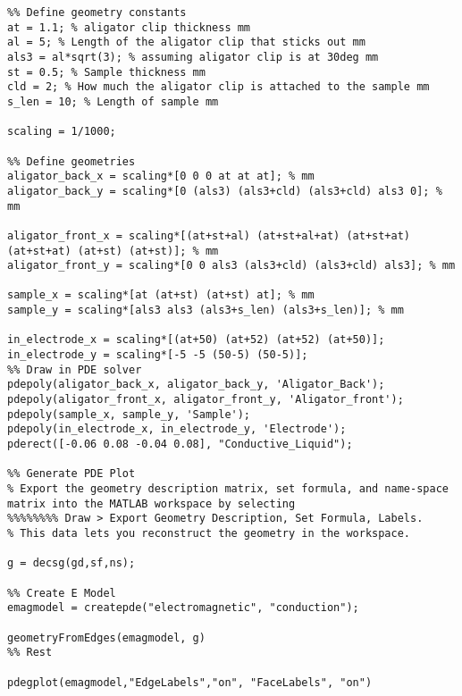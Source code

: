 
\begin{lstlisting}
%% Define geometry constants
at = 1.1; % aligator clip thickness mm
al = 5; % Length of the aligator clip that sticks out mm
als3 = al*sqrt(3); % assuming aligator clip is at 30deg mm
st = 0.5; % Sample thickness mm
cld = 2; % How much the aligator clip is attached to the sample mm
s_len = 10; % Length of sample mm

scaling = 1/1000;

%% Define geometries
aligator_back_x = scaling*[0 0 0 at at at]; % mm
aligator_back_y = scaling*[0 (als3) (als3+cld) (als3+cld) als3 0]; % mm

aligator_front_x = scaling*[(at+st+al) (at+st+al+at) (at+st+at) (at+st+at) (at+st) (at+st)]; % mm
aligator_front_y = scaling*[0 0 als3 (als3+cld) (als3+cld) als3]; % mm

sample_x = scaling*[at (at+st) (at+st) at]; % mm
sample_y = scaling*[als3 als3 (als3+s_len) (als3+s_len)]; % mm

in_electrode_x = scaling*[(at+50) (at+52) (at+52) (at+50)];
in_electrode_y = scaling*[-5 -5 (50-5) (50-5)];
%% Draw in PDE solver
pdepoly(aligator_back_x, aligator_back_y, 'Aligator_Back');
pdepoly(aligator_front_x, aligator_front_y, 'Aligator_front');
pdepoly(sample_x, sample_y, 'Sample');
pdepoly(in_electrode_x, in_electrode_y, 'Electrode');
pderect([-0.06 0.08 -0.04 0.08], "Conductive_Liquid");

%% Generate PDE Plot
% Export the geometry description matrix, set formula, and name-space matrix into the MATLAB workspace by selecting
%%%%%%%% Draw > Export Geometry Description, Set Formula, Labels.
% This data lets you reconstruct the geometry in the workspace.

g = decsg(gd,sf,ns);

%% Create E Model
emagmodel = createpde("electromagnetic", "conduction");

geometryFromEdges(emagmodel, g)
%% Rest

pdegplot(emagmodel,"EdgeLabels","on", "FaceLabels", "on")


\end{lstlisting}
